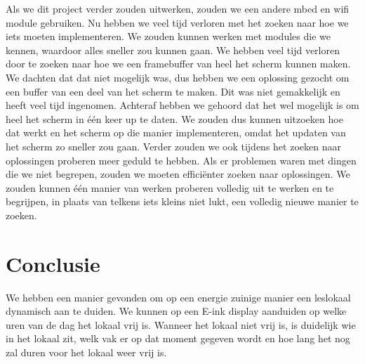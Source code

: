 \documentclass[a4paper,kul]{kulakarticle} %
\begin{document}
Als we dit project verder zouden uitwerken, zouden we een andere mbed en wifi module gebruiken. Nu hebben we veel tijd verloren met het zoeken naar hoe we iets moeten implementeren. We zouden kunnen werken met modules die we kennen, waardoor alles sneller zou kunnen gaan. 
\newline
\newline
We hebben veel tijd verloren door te zoeken naar hoe we een framebuffer van heel het scherm kunnen maken. We dachten dat dat niet mogelijk was, dus hebben we een oplossing gezocht om een buffer van een deel van het scherm te maken. Dit was niet gemakkelijk en heeft veel tijd ingenomen. Achteraf hebben we gehoord dat het wel mogelijk is om heel het scherm in één keer up te daten. We zouden dus kunnen uitzoeken hoe dat werkt en het scherm op die manier implementeren, omdat het updaten van het scherm zo sneller zou gaan. 
\newline
\newline
Verder zouden we ook tijdens het zoeken naar oplossingen proberen meer geduld te hebben. Als er problemen waren met dingen die we niet begrepen, zouden we moeten efficiënter zoeken naar oplossingen. We zouden kunnen één manier van werken proberen volledig uit te werken en te begrijpen, in plaats van telkens iets kleins niet lukt, een volledig nieuwe manier te zoeken.

\newpage

\section{Conclusie}

We hebben een manier gevonden om op een energie zuinige manier een leslokaal dynamisch aan te duiden. We kunnen op een E-ink display aanduiden op welke uren van de dag het lokaal vrij is. Wanneer het lokaal niet vrij is, is duidelijk wie in het lokaal zit, welk vak er op dat moment gegeven wordt en hoe lang het nog zal duren voor het lokaal  weer vrij is.

\newpage



\end{document}
